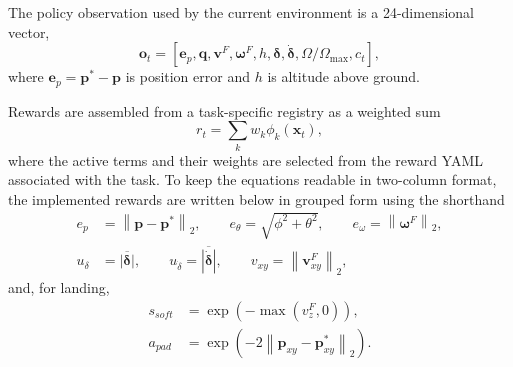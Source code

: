\documentclass[10pt,twocolumn]{article}
\begin{document}
The policy observation used by the current environment is a 24-dimensional vector,
\begin{equation}
\mathbf{o}_t = \left[
\mathbf{e}_{p},
\mathbf{q},
\mathbf{v}^{F},
\boldsymbol{\omega}^{F},
h,
\boldsymbol{\delta},
\dot{\boldsymbol{\delta}},
\Omega/\Omega_{\max},
c_t
\right],
\label{eq:obs}
\end{equation}
where $\mathbf{e}_{p}=\mathbf{p}^{*}-\mathbf{p}$ is position error and $h$ is altitude above ground.

Rewards are assembled from a task-specific registry as a weighted sum
\begin{equation}
r_t = \sum_{k} w_k \phi_k(\mathbf{x}_t),
\label{eq:reward_sum}
\end{equation}
where the active terms and their weights are selected from the reward YAML associated with the task. To keep the equations readable in two-column format, the implemented rewards are written below in grouped form using the shorthand
\begin{equation}
\begin{aligned}
e_p &= \left\|\mathbf{p}-\mathbf{p}^{*}\right\|_2, \qquad
e_\theta = \sqrt{\phi^2+\theta^2}, \qquad
e_\omega = \left\|\boldsymbol{\omega}^{F}\right\|_2,\\
u_\delta &= \overline{|\boldsymbol{\delta}|}, \qquad
u_{\dot\delta} = \overline{|\dot{\boldsymbol{\delta}}|}, \qquad
v_{xy} = \left\|\mathbf{v}_{xy}^{F}\right\|_2,
\end{aligned}
\label{eq:reward_shorthand}
\end{equation}
and, for landing,
\begin{equation}
\begin{aligned}
s_{soft} &= \exp\!\left(-\max(v_z^{F},0)\right),\\
a_{pad} &= \exp\!\left(-2\left\|\mathbf{p}_{xy}-\mathbf{p}^{*}_{xy}\right\|_2\right).
\end{aligned}
\label{eq:landing_reward_shorthand}
\end{equation}
\end{document}
